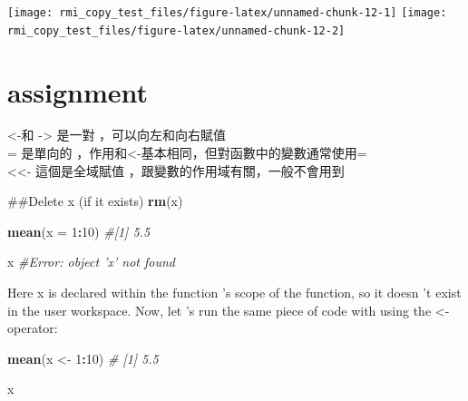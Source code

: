\documentclass[]{book}
\newenvironment{Shaded}{\begin{snugshade}}{\end{snugshade}}
\newcommand{\KeywordTok}[1]{\textcolor[rgb]{0.13,0.29,0.53}{\textbf{#1}}}
\newcommand{\DataTypeTok}[1]{\textcolor[rgb]{0.13,0.29,0.53}{#1}}
\newcommand{\DecValTok}[1]{\textcolor[rgb]{0.00,0.00,0.81}{#1}}
\newcommand{\StringTok}[1]{\textcolor[rgb]{0.31,0.60,0.02}{#1}}
\newcommand{\CommentTok}[1]{\textcolor[rgb]{0.56,0.35,0.01}{\textit{#1}}}
\newcommand{\OperatorTok}[1]{\textcolor[rgb]{0.81,0.36,0.00}{\textbf{#1}}}
\newcommand{\NormalTok}[1]{#1}
\theoremstyle{definition}
\theoremstyle{definition}
\theoremstyle{definition}
\theoremstyle{remark}
\begin{document}
\begin{center}\texttt{[image: rmi\_copy\_test\_files/figure-latex/unnamed-chunk-12-1]} \texttt{[image: rmi\_copy\_test\_files/figure-latex/unnamed-chunk-12-2]} \end{center}

\section{assignment}\label{assignment}

\textless{}-和 -\textgreater{} 是一對 ，可以向左和向右賦值\\
= 是單向的 ，作用和\textless{}-基本相同，但對函數中的變數通常使用=\\
\textless{}\textless{}- 這個是全域賦值
，跟變數的作用域有關，一般不會用到

\begin{Shaded}
\begin{Highlighting}[]
\NormalTok{##Delete x (if it exists)}
\KeywordTok{rm}\NormalTok{(x)}
\end{Highlighting}
\end{Shaded}

\begin{Shaded}
\begin{Highlighting}[]
\KeywordTok{mean}\NormalTok{(}\DataTypeTok{x =} \DecValTok{1}\OperatorTok{:}\DecValTok{10}\NormalTok{) }\CommentTok{#[1] 5.5}
\end{Highlighting}
\end{Shaded}

\begin{Shaded}
\begin{Highlighting}[]
\NormalTok{x }\CommentTok{#Error: object 'x' not found}
\end{Highlighting}
\end{Shaded}

Here x is declared within the function 's scope of the function, so it
doesn 't exist in the user workspace. Now, let 's run the same piece of
code with using the \textless{}- operator:

\begin{Shaded}
\begin{Highlighting}[]
\KeywordTok{mean}\NormalTok{(x <-}\StringTok{ }\DecValTok{1}\OperatorTok{:}\DecValTok{10}\NormalTok{) }\CommentTok{# [1] 5.5}
\end{Highlighting}
\end{Shaded}

\begin{Shaded}
\begin{Highlighting}[]
\NormalTok{x}
\end{Highlighting}
\end{Shaded}
\end{document}
